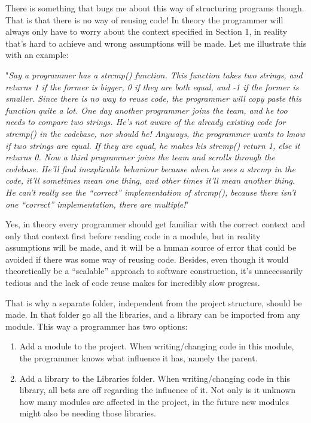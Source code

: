 \documentclass{article}
\begin{document}
There is something that bugs me about this way of structuring programs though. That is that there is no way of reusing code! In theory the programmer will always only have to worry about the context specified in Section 1, in reality that’s hard to achieve and wrong assumptions will be made. Let me illustrate this with an example:

"\emph{Say a programmer has a strcmp() function. This function takes two strings, and returns 1 if the former is bigger, 0 if they are both equal, and -1 if the former is smaller. Since there is no way to reuse code, the programmer will copy paste this function quite a lot. One day another programmer joins the team, and he too needs to compare two strings. He’s not aware of the already existing code for strcmp() in the codebase, nor should he! Anyways, the programmer wants to know if two strings are equal. If they are equal, he makes his strcmp() return 1, else it returns 0. Now a third programmer joins the team and scrolls through the codebase. He’ll find inexplicable behaviour because when he sees a strcmp in the code, it’ll sometimes mean one thing, and other times it’ll mean another thing. He can’t really see the “correct” implementation of strcmp(), because there isn’t one “correct” implementation, there are multiple!}"


Yes, in theory every programmer should get familiar with the correct context and only that context first before reading code in a module, but in reality assumptions will be made, and it will be a human source of error that could be avoided if there was some way of reusing code. Besides, even though it would theoretically be a “scalable” approach to software construction, it’s unnecessarily tedious and the lack of code reuse makes for incredibly slow progress.

That is why a separate folder, independent from the project structure, should be made. In that folder go all the libraries, and a library can be imported from any module. This way a programmer has two options:

\begin{enumerate}
    \item Add a module to the project. When writing/changing code in this module, the programmer knows what influence it has, namely the parent.
    \item Add a library to the Libraries folder. When writing/changing code in this library, all bets are off regarding the influence of it. Not only is it unknown how many modules are affected in the project, in the future new modules might also be needing those libraries.

\end{enumerate}
\end{document}
